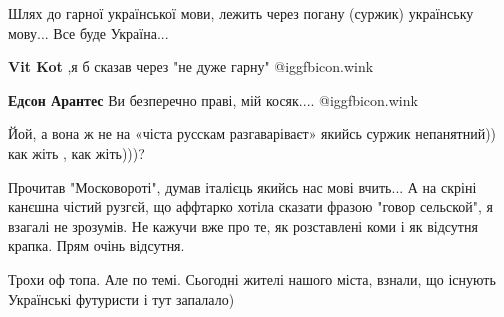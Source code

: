 \begin{itemize}
Шлях до гарної української мови, лежить через погану (суржик) українську
мову... Все буде Україна...

\begin{itemize}
 
\textbf{Vit Kot} ,я б сказав через "не дуже гарну"  @igg{fbicon.wink} 

 
\textbf{Едсон Арантес} Ви безперечно праві, мій косяк....  @igg{fbicon.wink} 

\end{itemize}

 
Йой, а вона ж не на «чіста русскам разгаваріваєт» якийсь суржик непанятний)) как жіть , как жіть)))?

 

Прочитав "Московороті", думав італієць якийсь нас мові вчить... А на скріні
канєшна чістий рузгєй, що аффтарко хотіла сказати фразою "говор сельской", я
взагалі не зрозумів. Не кажучи вже про те, як розставлені коми і як відсутня
крапка. Прям очінь відсутня.


 
Трохи оф топа.
Але по темі.
Сьогодні жителі нашого міста, взнали, що існують Українські футуристи і тут запалало)


\end{itemize}

